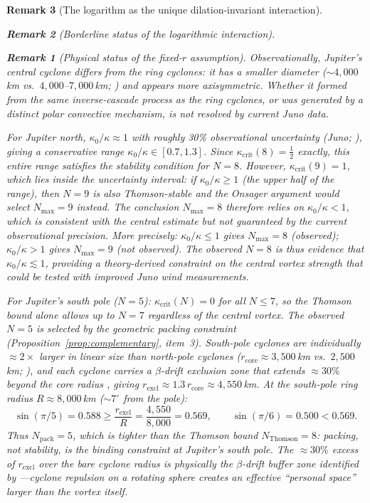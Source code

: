 \documentclass[12pt, a4paper]{article}
\newtheorem{remark}{Remark}[section]
\numberwithin{equation}{section}
\begin{document}
\begin{remark}[The logarithm as the unique dilation-invariant interaction]
\begin{remark}[Borderline status of the logarithmic interaction]
\begin{remark}[Physical status of the fixed-$r$ assumption]
Observationally, Jupiter's central cyclone differs from the ring
cyclones: it has a smaller diameter
($\sim\!4{,}000$\,km vs.\ $4{,}000$--$7{,}000$\,km;
\citealt{Adriani2018}) and appears more axisymmetric.  Whether it
formed from the same inverse-cascade process as the ring cyclones,
or was generated by a distinct polar convective mechanism, is not
resolved by current Juno data.
\end{remark}

\noindent
For Jupiter north, $\kappa_0/\kappa \approx 1$ with roughly 30\%
observational uncertainty (Juno; \citealt{Adriani2018}), giving a
conservative range $\kappa_0/\kappa \in [0.7, 1.3]$.  Since
$\kappa_{\mathrm{crit}}(8) = \tfrac{1}{2}$ exactly, this entire
range satisfies the stability condition for $N = 8$.  However,
$\kappa_{\mathrm{crit}}(9) = 1$, which lies \emph{inside} the
uncertainty interval: if $\kappa_0/\kappa \ge 1$ (the upper half
of the range), then $N = 9$ is also Thomson-stable and the Onsager
argument would select $N_{\max} = 9$ instead.  The conclusion
$N_{\max} = 8$ therefore relies on $\kappa_0/\kappa < 1$, which is
consistent with the central estimate but not guaranteed by the
current observational precision.  More precisely:
$\kappa_0/\kappa \le 1$ gives $N_{\max} = 8$ (observed);
$\kappa_0/\kappa > 1$ gives $N_{\max} = 9$ (not observed).  The
observed $N = 8$ is thus evidence that $\kappa_0/\kappa \lesssim 1$,
providing a theory-derived constraint on the central vortex
strength that could be tested with improved Juno wind
measurements.

\label{sec:n-selection}%
For Jupiter's south pole ($N = 5$): $\kappa_{\mathrm{crit}}(N) = 0$
for all $N \le 7$, so the Thomson bound alone allows up to $N = 7$
regardless of the central vortex.  The observed $N = 5$ is selected
by the geometric packing constraint
(Proposition~\ref{prop:complementary}, item~3).
South-pole cyclones are individually $\approx 2\times$ larger in
linear size than north-pole cyclones ($r_{\mathrm{core}} \approx
3{,}500$\,km vs.\ $2{,}500$\,km; \citealt{Adriani2018}), and each
cyclone carries a $\beta$-drift exclusion zone that extends $\approx
30\%$ beyond the core radius \citep{Gavriel2021}, giving
$r_{\mathrm{excl}} \approx 1.3\,r_{\mathrm{core}} \approx 4{,}550$\,km.
At the south-pole ring radius $R \approx 8{,}000$\,km
($\sim\!7^{\circ}$ from the pole):
\[
  \sin(\pi/5) = 0.588 \ge \frac{r_{\mathrm{excl}}}{R}
  = \frac{4{,}550}{8{,}000} = 0.569,
  \qquad
  \sin(\pi/6) = 0.500 < 0.569.
\]
Thus $N_{\mathrm{pack}} = 5$, which is tighter than the Thomson bound
$N_{\mathrm{Thomson}} = 8$: packing, not stability, is the binding
constraint at Jupiter's south pole.  The $\approx 30\%$ excess of
$r_{\mathrm{excl}}$ over the bare cyclone radius is physically the
$\beta$-drift buffer zone identified by \citet{Gavriel2021}---cyclone
repulsion on a rotating sphere creates an effective ``personal space''
larger than the vortex itself.



\end{remark}
\end{remark}
\end{document}
